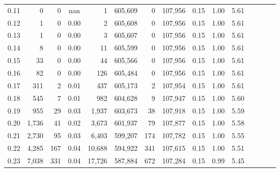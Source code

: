 \begin{tabular}{rrrcrrrrrrrrrrr}
0.11 &       0 &      0 &                                        nan &        1 &  605,609 &        0 &  107,956 &  0.15 &  1.00 &                         5.61 \\
0.12 &       1 &      0 &                                       0.00 &        2 &  605,608 &        0 &  107,956 &  0.15 &  1.00 &                         5.61 \\
0.13 &       1 &      0 &                                       0.00 &        3 &  605,607 &        0 &  107,956 &  0.15 &  1.00 &                         5.61 \\
0.14 &       8 &      0 &                                       0.00 &       11 &  605,599 &        0 &  107,956 &  0.15 &  1.00 &                         5.61 \\
0.15 &      33 &      0 &                                       0.00 &       44 &  605,566 &        0 &  107,956 &  0.15 &  1.00 &                         5.61 \\
0.16 &      82 &      0 &                                       0.00 &      126 &  605,484 &        0 &  107,956 &  0.15 &  1.00 &                         5.61 \\
0.17 &     311 &      2 &                                       0.01 &      437 &  605,173 &        2 &  107,954 &  0.15 &  1.00 &                         5.61 \\
0.18 &     545 &      7 &                                       0.01 &      982 &  604,628 &        9 &  107,947 &  0.15 &  1.00 &                         5.60 \\
0.19 &     955 &     29 &                                       0.03 &    1,937 &  603,673 &       38 &  107,918 &  0.15 &  1.00 &                         5.59 \\
0.20 &   1,736 &     41 &                                       0.02 &    3,673 &  601,937 &       79 &  107,877 &  0.15 &  1.00 &                         5.58 \\
0.21 &   2,730 &     95 &                                       0.03 &    6,403 &  599,207 &      174 &  107,782 &  0.15 &  1.00 &                         5.55 \\
0.22 &   4,285 &    167 &                                       0.04 &   10,688 &  594,922 &      341 &  107,615 &  0.15 &  1.00 &                         5.51 \\
0.23 &   7,038 &    331 &                                       0.04 &   17,726 &  587,884 &      672 &  107,284 &  0.15 &  0.99 &                         5.45 \\

\end{tabular}
